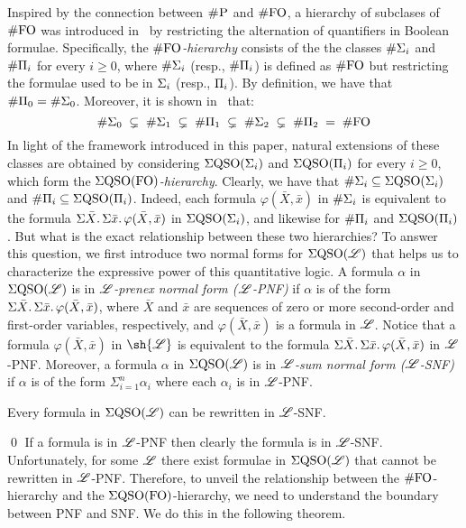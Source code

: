 
Inspired by the connection between $\text{\sc \#P}$ and $\#{\rm FO}$, a hierarchy of subclases of $\#{\rm FO}$ was introduced in~\cite{SalujaST95} 
by restricting the alternation of quantifiers in Boolean formulae.
Specifically, the \emph{$\#{\rm FO}$-hierarchy} consists of the 
the classes $\#\Sigma_{i}$ and $\#\Pi_{i}$ for every $i \geq 0$, where $\#\Sigma_{i}$ (resp., $\#\Pi_{i}$) is defined as $\#{\rm FO}$ but restricting the formulae used to be in $\Sigma_{i}$ (resp., $\Pi_{i}$).
By definition, we have that $\#\Pi_{0} = \#\Sigma_{0}$. Moreover, it is shown in~\cite{SalujaST95} that:
\[
\#\Sigma_{0} \; \subsetneq \; \#\Sigma_{1} \; \subsetneq \; \#\Pi_{1} \; \subsetneq \; \#\Sigma_{2} \; \subsetneq \; \#\Pi_{2} \; = \; \#{\rm FO} 
\]
In light of the framework introduced in this paper, natural extensions of these classes are obtained by considering 
$\Sigma{\rm QSO}(\Sigma_{i})$ and $\Sigma{\rm QSO}(\Pi_{i})$ for every $i \geq 0$, which form the \emph{$\Sigma{\rm QSO}({\rm FO})$-hierarchy}.
Clearly, we have that $\#\Sigma_{i} \subseteq \Sigma{\rm QSO}(\Sigma_{i})$ and $\#\Pi_{i} \subseteq \Sigma{\rm QSO}(\Pi_{i})$. Indeed, each formula $\varphi(\bar{X}, \bar{x})$ in $\#\Sigma_{i}$ is equivalent to the formula $\Sigma{\bar X}.\, \Sigma{\bar x}.\, \varphi(\bar{X}, \bar{x})$ in $\Sigma{\rm QSO}(\Sigma_{i})$, and likewise for $\#\Pi_{i}$ and $\Sigma{\rm QSO}(\Pi_{i})$.
But what is the exact relationship between these two hierarchies?
To answer this question, we first introduce two normal forms for $\Sigma{\rm QSO}(\mathscr{L})$ that helps us to characterize the expressive power of this quantitative logic.
A formula $\alpha$ in $\Sigma{\rm QSO}(\mathscr{L})$ is in \emph{$\mathscr{L}$-prenex normal form ($\mathscr{L}$-PNF)} 
if $\alpha$ is of the form
$\Sigma{\bar{X}}.\, \Sigma{\bar{x}}.\, \varphi(\bar{X}, \bar{x})$,
where $\bar{X}$ and $\bar{x}$ are sequences of zero or more second-order and first-order variables, respectively, and $\varphi(\bar{X}, \bar{x})$ is a formula in $\mathscr{L}$. Notice that 
a formula $\varphi(\bar{X}, \bar{x})$ in $\sh{\LL}$ is equivalent to the formula $\Sigma{\bar X}.\, \Sigma{\bar x}.\, \varphi(\bar{X}, \bar{x})$ in $\mathscr{L}$-PNF. 
Moreover, a formula $\alpha$ in $\Sigma{\rm QSO}(\mathscr{L})$ is in \emph{$\mathscr{L}$-sum normal form ($\mathscr{L}$-SNF)} if $\alpha$ is of the form $\Sigma_{i=1}^n \alpha_i$ where each $\alpha_i$ is in $\mathscr{L}$-PNF. 
\begin{prop}\label{theo-pnf-snf}
Every formula in $\Sigma{\rm QSO}(\mathscr{L})$ can be rewritten in $\mathscr{L}$-SNF.
\end{prop}
\proof

\qed
If a formula is in $\mathscr{L}$-PNF then clearly the formula is in $\mathscr{L}$-SNF.
Unfortunately, for some $\mathscr{L}$ there exist formulae in $\Sigma{\rm QSO}(\mathscr{L})$  that cannot be rewritten in $\mathscr{L}$-PNF.
Therefore, to unveil the relationship between the $\#{\rm FO}$-hierarchy and the $\Sigma{\rm QSO}({\rm FO})$-hierarchy, we need to understand the boundary between PNF and SNF. We do this in the following theorem. 
